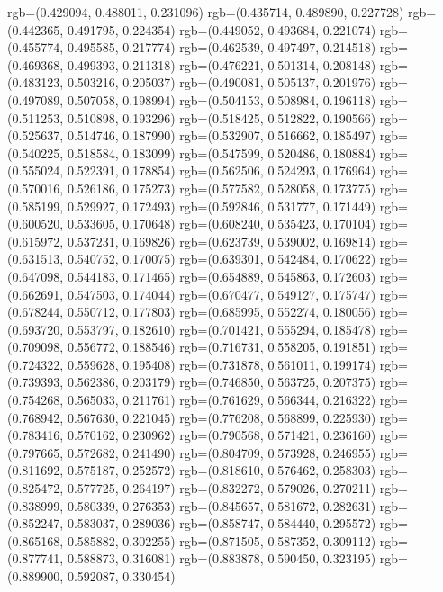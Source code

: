 {{{					rgb=(0.429094, 0.488011, 0.231096)
					rgb=(0.435714, 0.489890, 0.227728)
					rgb=(0.442365, 0.491795, 0.224354)
					rgb=(0.449052, 0.493684, 0.221074)
					rgb=(0.455774, 0.495585, 0.217774)
					rgb=(0.462539, 0.497497, 0.214518)
					rgb=(0.469368, 0.499393, 0.211318)
					rgb=(0.476221, 0.501314, 0.208148)
					rgb=(0.483123, 0.503216, 0.205037)
					rgb=(0.490081, 0.505137, 0.201976)
					rgb=(0.497089, 0.507058, 0.198994)
					rgb=(0.504153, 0.508984, 0.196118)
					rgb=(0.511253, 0.510898, 0.193296)
					rgb=(0.518425, 0.512822, 0.190566)
					rgb=(0.525637, 0.514746, 0.187990)
					rgb=(0.532907, 0.516662, 0.185497)
					rgb=(0.540225, 0.518584, 0.183099)
					rgb=(0.547599, 0.520486, 0.180884)
					rgb=(0.555024, 0.522391, 0.178854)
					rgb=(0.562506, 0.524293, 0.176964)
					rgb=(0.570016, 0.526186, 0.175273)
					rgb=(0.577582, 0.528058, 0.173775)
					rgb=(0.585199, 0.529927, 0.172493)
					rgb=(0.592846, 0.531777, 0.171449)
					rgb=(0.600520, 0.533605, 0.170648)
					rgb=(0.608240, 0.535423, 0.170104)
					rgb=(0.615972, 0.537231, 0.169826)
					rgb=(0.623739, 0.539002, 0.169814)
					rgb=(0.631513, 0.540752, 0.170075)
					rgb=(0.639301, 0.542484, 0.170622)
					rgb=(0.647098, 0.544183, 0.171465)
					rgb=(0.654889, 0.545863, 0.172603)
					rgb=(0.662691, 0.547503, 0.174044)
					rgb=(0.670477, 0.549127, 0.175747)
					rgb=(0.678244, 0.550712, 0.177803)
					rgb=(0.685995, 0.552274, 0.180056)
					rgb=(0.693720, 0.553797, 0.182610)
					rgb=(0.701421, 0.555294, 0.185478)
					rgb=(0.709098, 0.556772, 0.188546)
					rgb=(0.716731, 0.558205, 0.191851)
					rgb=(0.724322, 0.559628, 0.195408)
					rgb=(0.731878, 0.561011, 0.199174)
					rgb=(0.739393, 0.562386, 0.203179)
					rgb=(0.746850, 0.563725, 0.207375)
					rgb=(0.754268, 0.565033, 0.211761)
					rgb=(0.761629, 0.566344, 0.216322)
					rgb=(0.768942, 0.567630, 0.221045)
					rgb=(0.776208, 0.568899, 0.225930)
					rgb=(0.783416, 0.570162, 0.230962)
					rgb=(0.790568, 0.571421, 0.236160)
					rgb=(0.797665, 0.572682, 0.241490)
					rgb=(0.804709, 0.573928, 0.246955)
					rgb=(0.811692, 0.575187, 0.252572)
					rgb=(0.818610, 0.576462, 0.258303)
					rgb=(0.825472, 0.577725, 0.264197)
					rgb=(0.832272, 0.579026, 0.270211)
					rgb=(0.838999, 0.580339, 0.276353)
					rgb=(0.845657, 0.581672, 0.282631)
					rgb=(0.852247, 0.583037, 0.289036)
					rgb=(0.858747, 0.584440, 0.295572)
					rgb=(0.865168, 0.585882, 0.302255)
					rgb=(0.871505, 0.587352, 0.309112)
					rgb=(0.877741, 0.588873, 0.316081)
					rgb=(0.883878, 0.590450, 0.323195)
					rgb=(0.889900, 0.592087, 0.330454)
}}}
